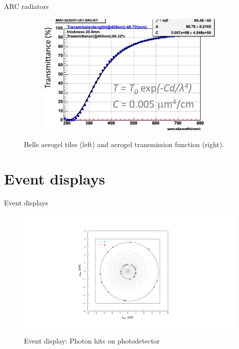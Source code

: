 \documentclass{beamer}
\begin{document}
\begin{frame}{ARC radiators}
\begin{figure}
\begin{subfigure}{0.25\textwidth}
    \end{subfigure}%
    \hspace{0.2cm}
    \begin{subfigure}{0.25\textwidth}
      \includegraphics[width = 1.0\textwidth]{Plots/AerogelTransmission.png}
    \end{subfigure}
    \caption{Belle aerogel tiles (left) and aerogel transmission function (right).}
  \end{figure}
\end{frame}

\section{Event displays}
\begin{frame}{Event displays}
  \begin{figure}
    \centering
    \includegraphics[width = 1.0\textwidth, trim = {4cm 2cm 4cm 2cm}, clip = true]{Plots/Display1.pdf}
    \caption{Event display: Photon hits on photodetector}
  \end{figure}
\end{frame}
\end{document}
